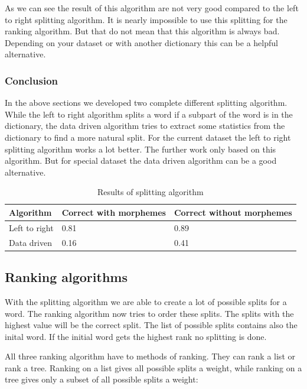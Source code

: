 \documentclass[11pt, accentcolor=tud9b, nochapname]{tudreport}
\begin{document}
As we can see the result of this algorithm are not very good compared to the left to right splitting algorithm. It is nearly impossible to use this splitting for the ranking algorithm. But that do not mean that this algorithm is always bad. Depending on your dataset or with another dictionary this can be a helpful alternative.

\subsubsection{Conclusion}

In the above sections we developed two complete different splitting algorithm. While the left to right algorithm splits a word if a subpart of the word is in the dictionary, the data driven algorithm tries to extract some statistics from the dictionary to find a more natural split. For the current dataset the left to right splitting algorithm works a lot better. The further work only based on this algorithm. But for special dataset the data driven algorithm can be a good alternative.

\begin{table}[h]
\begin{center}
\begin{tabular}{l | l | l}
  \hline
  \textbf{Algorithm}  & \textbf{Correct with morphemes} & \textbf{Correct without morphemes} \\ \hline
  Left to right & 0.81 & 0.89 \\ \hline
  Data driven & 0.16 & 0.41 \\ \hline
\end{tabular}
\end{center}
\caption{Results of splitting algorithm}
\end{table}

\subsection{Ranking algorithms}

With the splitting algorithm we are able to create a lot of possible splits for a word. The ranking algorithm now tries to order these splits. The splits with the highest value will be the correct split. The list of possible splits contains also the inital word. If the initial word gets the highest rank no splitting is done.

All three ranking algorithm have to methods of ranking. They can rank a list or rank a tree. Ranking on a list gives all possible splits a weight, while ranking on a tree gives only a subset of all possible splits a weight:
\end{document}
